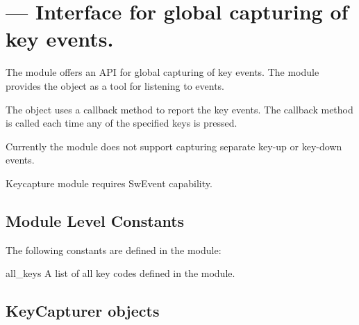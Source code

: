 %
%
%

\section{ ---
         Interface for global capturing of key events.}
\label{sec:keycapture}


The  module offers an API for global capturing of key events. The 
 module provides the  object as a tool for listening to 
events.

The  object uses a callback method to report the key 
events. The callback method is called each time any of the specified keys 
is pressed.

Currently the  module does not support capturing separate key-up or
key-down events.

\begin{notice}[note]
Keycapture module requires SwEvent capability.
\end{notice}

\subsection{Module Level Constants}
The following constants are defined in the  module:

\begin{datadesc}{all_keys}
A list of all key codes defined in the  module.
\end{datadesc}

\subsection{KeyCapturer objects} 
\label{KeyCapturer objects}

